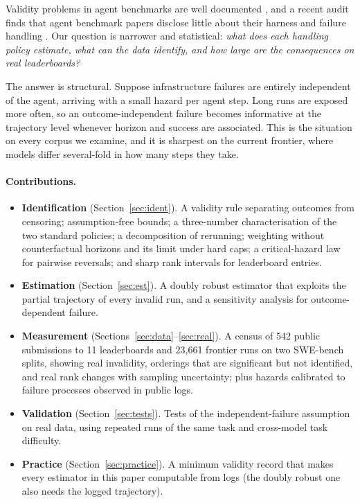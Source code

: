 \documentclass[11pt]{article}
\theoremstyle{definition}
\theoremstyle{remark}
\begin{document}
Validity problems in agent benchmarks are well documented
\citep{kapoor2024agentsthatmatter,weidinger2025evalscience,zhu2026guardrails},
and a recent audit finds that agent benchmark papers disclose little about their
harness and failure handling \citep{moghadasi2026disclose}. Our question is
narrower and statistical: \emph{what does each handling policy estimate, what
can the data identify, and how large are the consequences on real
leaderboards?}

The answer is structural. Suppose infrastructure failures are entirely
independent of the agent, arriving with a small hazard per agent step. Long runs
are exposed more often, so an outcome-independent failure becomes informative at
the trajectory level whenever horizon and success are associated. This is the
situation on every corpus we examine, and it is sharpest on the current
frontier, where models differ several-fold in how many steps they take.

\paragraph{Contributions.}
\begin{itemize}
\item \textbf{Identification} (Section~\ref{sec:ident}). A validity rule
separating outcomes from censoring; assumption-free bounds; a three-number
characterisation of the two standard policies; a decomposition of rerunning;
weighting without counterfactual horizons and its limit under hard caps; a
critical-hazard law for pairwise reversals; and sharp rank intervals for
leaderboard entries.
\item \textbf{Estimation} (Section~\ref{sec:est}). A doubly robust estimator
that exploits the partial trajectory of every invalid run, and a sensitivity
analysis for outcome-dependent failure.
\item \textbf{Measurement} (Sections~\ref{sec:data}--\ref{sec:real}). A census of
542 public submissions to 11 leaderboards and 23{,}661 frontier runs on two
SWE-bench splits, showing real invalidity, orderings that are significant but
not identified, and real rank changes with sampling uncertainty; plus hazards
calibrated to failure processes observed in public logs.
\item \textbf{Validation} (Section~\ref{sec:tests}). Tests of the
independent-failure assumption on real data, using repeated runs of the same
task and cross-model task difficulty.
\item \textbf{Practice} (Section~\ref{sec:practice}). A minimum validity record
that makes every estimator in this paper computable from logs (the doubly robust
one also needs the logged trajectory).
\end{itemize}
\end{document}
